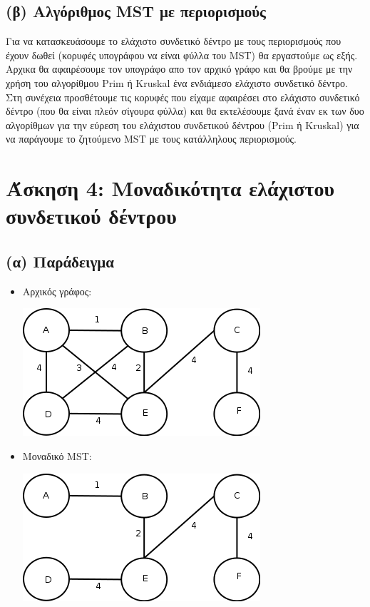 \documentclass[a4paper,12pt]{report}
\begin{document}
\subsection*{(β) Αλγόριθμος MST με περιορισμούς}
Για να κατασκευάσουμε το ελάχιστο συνδετικό δέντρο με τους περιορισμούς που έχουν δωθεί (κορυφές υπογράφου να είναι φύλλα του MST) θα εργαστούμε ως εξής. Αρχικα θα αφαιρέσουμε τον υπογράφο απο τον αρχικό γράφο και θα βρούμε με την χρήση του αλγορίθμου Prim ή Kruskal ένα ενδιάμεσο ελάχιστο συνδετικό δέντρο. Στη συνέχεια προσθέτουμε τις κορυφές που είχαμε αφαιρέσει στο ελάχιστο συνδετικό δέντρο (που θα είναι πλεόν σίγουρα φύλλα) και θα εκτελέσουμε ξανά έναν εκ των δυο αλγορίθμων για την εύρεση του ελάχιστου συνδετικού δέντρου (Prim ή Kruskal) για να παράγουμε το ζητούμενο MST με τους κατάλληλους περιορισμούς.

\section*{Άσκηση 4: Μοναδικότητα ελάχιστου συνδετικού δέντρου}
\subsection*{(α) Παράδειγμα}
\begin{itemize}
 \item Αρχικός γράφος:
\begin{center}
 \includegraphics[scale=0.5]{./files/ex4-graph.png}
\end{center}
 \item Mοναδικό MST:
\begin{center}
 \includegraphics[scale=0.5]{./files/ex4-mst.png}
\end{center}
\end{itemize}
\end{document}
